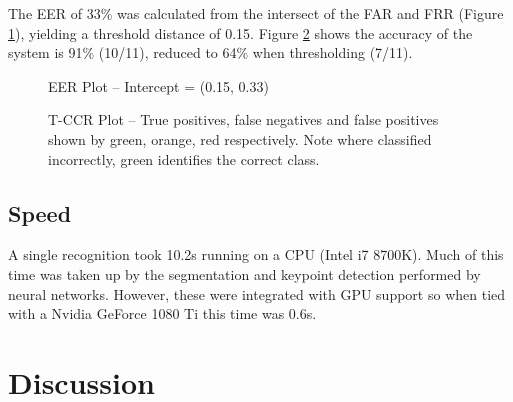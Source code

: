 \documentclass[conference]{IEEEtran}
\newcommand\inputpgf[2]{{
\let\pgfimageWithoutPath\pgfimage
\renewcommand{\pgfimage}[2][]{\pgfimageWithoutPath[##1]{#1/##2}}

}}
\begin{document}
\noindent The EER of 33\% was calculated from the intersect of the FAR and FRR (Figure \ref{fig:eer_plot}), yielding a threshold distance of 0.15. Figure \ref{fig:ccr_plot} shows the accuracy of the system is 91\% (10/11), reduced to 64\% when thresholding (7/11).

\begin{figure}[H]\centering
  \inputpgf{figures/}{eer_plot.pgf}\vspace{-3.5mm}
  \caption{EER Plot -- Intercept = (0.15, 0.33)}\label{fig:eer_plot}
\end{figure}
\vspace{-5.0mm}
\begin{figure}[H]\centering
  \inputpgf{figures/}{ccr_plot.pgf}
  \caption{T-CCR Plot -- True positives, false negatives and false positives shown by green, orange, red respectively. Note where classified incorrectly, green identifies the correct class.}\label{fig:ccr_plot}
\end{figure}

\subsection{Speed}
\noindent A single recognition took 10.2s running on a CPU (Intel i7 8700K). Much of this time was taken up by the segmentation and keypoint detection performed by neural networks. However, these were integrated with GPU support so when tied with a Nvidia GeForce 1080 Ti this time was 0.6s.

\section{Discussion}
\end{document}

